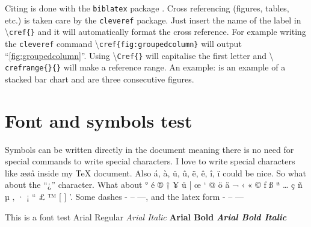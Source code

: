 Citing is done with the \texttt{biblatex} package \cite{biblatex}.
Cross referencing (figures, tables, etc.) is taken care by the
\texttt{cleveref} package. Just insert the name of the label in
\textbackslash \texttt{cref\{\}} and it will automatically format the
cross reference. For example writing the \texttt{cleveref} command
\textbackslash \texttt{cref\{fig:groupedcolumn\}} will output
``\cref{fig:groupedcolumn}''. Using \textbackslash \texttt{Cref\{\}}
will capitalise the first letter and \textbackslash
\texttt{crefrange\{\}\{\}} will make a reference range. An example:
 is an example of a stacked bar chart and
 are three consecutive figures.

\section{Font and symbols test}
Symbols can be written directly in the document meaning there is no
need for special commands to write special characters. I love to
write special characters like æøå inside my \TeX{} document. Also á,
à, ü, û, ë, ê, î, ï could be nice. So what about the ``¿'' character.
What about ° é ® † ¥ ü | œ ‘ @ ö ä ¬ ‹ « © ƒ ß ª … ç ñ µ ‚ · ¡ “ £ ™
[ ] '. Some dashes - – —, and the latex form - -- ---

This is a font test \newline
Arial Regular \newline
\textit{Arial Italic} \newline
\textbf{Arial Bold} \newline
\textbf{\textit{Arial Bold Italic}}
